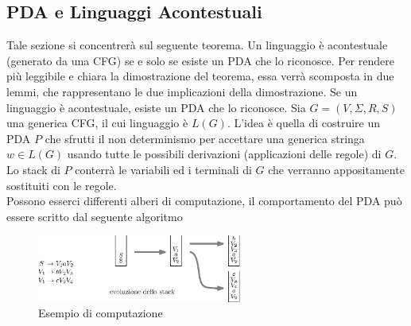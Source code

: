 \documentclass[10pt, letterpaper]{report}
\begin{document}
\subsection{PDA e Linguaggi Acontestuali}
Tale sezione si concentrerà sul seguente teorema.\acc 
\teo{} Un linguaggio è acontestuale (generato da una CFG) se e solo se esiste un PDA che lo riconosce.
Per rendere più leggibile e chiara la dimostrazione del teorema, essa verrà scomposta in due lemmi, che rappresentano le due implicazioni della 
dimostrazione. \acc 
\lemma{[$\implies$]}  Se un linguaggio è acontestuale, esiste un PDA che lo riconosce. \acc 
\dimo{[$\implies$]} Sia $G=(V,\Sigma, R, S)$ una generica CFG, il cui linguaggio è $L(G)$. L'idea è quella di costruire un PDA  $P$
che sfrutti il non determinismo per accettare una generica stringa $w\in L(G)$ usando tutte le possibili 
derivazioni (applicazioni delle regole) di $G$.\acc 
Lo stack di $P$ conterrà le variabili ed i terminali di $G$ che verranno appositamente sostituiti con le regole.\\ 
Possono esserci differenti alberi di computazione, il comportamento del PDA può essere scritto dal seguente 
algoritmo 
\begin{figure}[h!]
    \centering 
    \includegraphics[width=0.6\textwidth ]{images/esempioCFGPDA.eps}
    \caption{Esempio di computazione}
    \label{fig:esePDACGF}
\end{figure}
\end{document}
